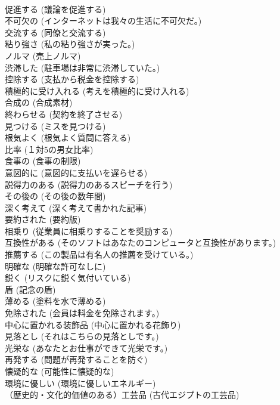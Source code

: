 \documentclass[8pt]{extreport}
\begin{document}
\begin{CJK}{UTF8}{min}
\\	促進する	(議論を促進する)		
\\	不可欠の	(インターネットは我々の生活に不可欠だ。)		
\\	交流する	(同僚と交流する)		
\\	粘り強さ	(私の粘り強さが実った。)		
\\	ノルマ	(売上ノルマ)		
\\	渋滞した	(駐車場は非常に渋滞していた。)		
\\	控除する	(支払から税金を控除する)		
\\	積極的に受け入れる	(考えを積極的に受け入れる)		
\\	合成の	(合成素材)		
\\	終わらせる	(契約を終了させる)		
\\	見つける	(ミスを見つける)		
\\	根気よく	(根気よく質問に答える)		
\\	比率	(１対5の男女比率)		
\\	食事の	(食事の制限)		
\\	意図的に	(意図的に支払いを遅らせる)		
\\	説得力のある	(説得力のあるスピーチを行う)		
\\	その後の	(その後の数年間)		
\\	深く考えて	(深く考えて書かれた記事)		
\\	要約された	(要約版)		
\\	相乗り	(従業員に相乗りすることを奨励する)		
\\	互換性がある	(そのソフトはあなたのコンピュータと互換性があります。)		
\\	推薦する	(この製品は有名人の推薦を受けている。)		
\\	明確な	(明確な許可なしに)		
\\	鋭く	(リスクに鋭く気付いている)		
\\	盾	(記念の盾)		
\\	薄める	(塗料を水で薄める)		
\\	免除された	(会員は料金を免除されます。)		
\\	中心に置かれる装飾品	(中心に置かれる花飾り)		
\\	見落とし	(それはこちらの見落としです。)		
\\	光栄な	(あなたとお仕事ができて光栄です。)		
\\	再発する	(問題が再発することを防ぐ)		
\\	懐疑的な	(可能性に懐疑的な)		
\\	環境に優しい	(環境に優しいエネルギー)		
\\	（歴史的・文化的価値のある）工芸品	(古代エジプトの工芸品)		

\end{CJK}
\end{document}
